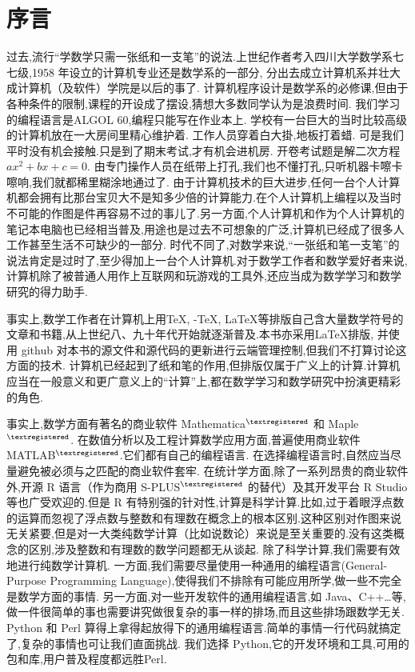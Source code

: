 %
\chapter*{序\quad 言}

\setcounter{page}{1}
\thispagestyle{empty}

过去,流行“学数学只需一张纸和一支笔”的说法.上世纪作者考入四川大学数学系七七级,1958 年设立的计算机专业还是数学系的一部分,
分出去成立计算机系并壮大成计算机（及软件）学院是以后的事了.
计算机程序设计是数学系的必修课,但由于各种条件的限制,课程的开设成了摆设,猜想大多数同学认为是浪费时间.
我们学习的编程语言是ALGOL 60,编程只能写在作业本上.
学校有一台巨大的当时比较高级的计算机放在一大房间里精心维护着.
工作人员穿着白大掛,地板打着蜡.
可是我们平时没有机会接触.只是到了期末考试,才有机会进机房.
开卷考试题是解二次方程 $ax^2+bx+c = 0$.
由专门操作人员在纸带上打孔,我们也不懂打孔,只听机器卡嚓卡嚓响,我们就都稀里糊涂地通过了.
由于计算机技术的巨大进步,任何一台个人计算机都会拥有比那台宝贝大不是知多少倍的计算能力.在个人计算机上编程以及当时不可能的作图是件再容易不过的事儿了.另一方面,个人计算机和作为个人计算机的笔记本电脑也已经相当普及,用途也是过去不可想象的广泛,计算机已经成了很多人工作甚至生活不可缺少的一部分.
时代不同了,对数学来说,“一张纸和笔一支笔”的说法肯定是过时了,至少得加上一台个人计算机.对于数学工作者和数学爱好者来说,计算机除了被普通人用作上互联网和玩游戏的工具外,还应当成为数学学习和数学研究的得力助手.

事实上,数学工作者在计算机上用\TeX, \AmS-\TeX, \LaTeX 等排版自己含大量数学符号的文章和书籍,从上世纪八、九十年代开始就逐渐普及.本书亦采用\LaTeX 排版, 并使用 github 对本书的源文件和源代码的更新进行云端管理控制,但我们不打算讨论这方面的技术.
计算机已经起到了纸和笔的作用,但排版仅属于广义上的计算.计算机应当在一般意义和更广意义上的“计算”上,都在数学学习和数学研究中扮演更精彩的角色.

事实上,数学方面有著名的商业软件 Mathematica${}^{\textregistered}$ 和 Maple${}^{\textregistered}$.
在数值分析以及工程计算数学应用方面,普遍使用商业软件 MATLAB${}^{\textregistered}$.它们都有自己的编程语言.
在选择编程语言时,自然应当尽量避免被必须与之匹配的商业软件套牢.
在统计学方面,除了一系列昂贵的商业软件外,开源 R 语言（作为商用 S-PLUS${}^{\textregistered}$ 的替代）及其开发平台 R Studio 等也广受欢迎的.但是 R 有特别强的针对性,计算是科学计算.比如,过于着眼浮点数的运算而忽视了浮点数与整数和有理数在概念上的根本区别.这种区别对作图来说无关紧要,但是对一大类纯数学计算（比如说数论）来说是至关重要的.没有这类概念的区别,涉及整数和有理数的数学问题都无从谈起.
除了科学计算,我们需要有效地进行纯数学计算机.
一方面,我们需要尽量使用一种通用的编程语言(General-Purpose Programming Language),使得我们不排除有可能应用所学,做一些不完全是数学方面的事情.
另一方面,对一些开发软件的通用编程语言,如 Java、C++…等,做一件很简单的事也需要讲究做很复杂的事一样的排场,而且这些排场跟数学无关. Python 和 Perl 算得上拿得起放得下的通用编程语言.简单的事情一行代码就搞定了,复杂的事情也可让我们直面挑战.
我们选择 Python,它的开发环境和工具,可用的包和库,用户普及程度都远胜Perl.

